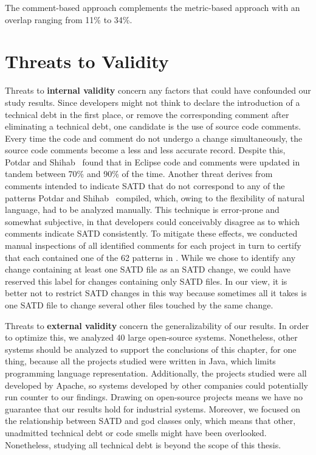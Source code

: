 {\begin{myboxii}
	The comment-based approach complements the metric-based approach with an overlap ranging from 11\% to 34\%.
\end{myboxii}



\pagebreak



\section{Threats to Validity}
\label{chap4:sec:threats_to_validity}


Threats to \textbf{internal validity} concern any factors that could have confounded our study results. Since developers might not think to declare the introduction of a technical debt in the first place, or remove the corresponding comment after eliminating a technical debt, one candidate is the use of source code comments. Every time the code and comment do not undergo a change simultaneously, the source code comments become a less and less accurate record. Despite this, Potdar and Shihab~\cite{ICSM_PotdarS14} found that in Eclipse code and comments were updated in tandem between 70\% and 90\% of the time. Another threat derives from comments intended to indicate SATD that do not correspond to any of the patterns Potdar and Shihab~\cite{ICSM_PotdarS14} compiled, which, owing to the flexibility of natural language, had to be analyzed manually. This technique is error-prone and somewhat subjective, in that developers could conceivably disagree as to which comments indicate SATD consistently. To mitigate these effects, we conducted manual inspections of all identified comments for each project in turn to certify that each contained one of the 62 patterns in \cite{ICSM_PotdarS14}. While we chose to identify any change containing at least one SATD file as an SATD change, we could have reserved this label for changes containing only SATD files. In our view, it is better not to restrict SATD changes in this way because sometimes all it takes is one SATD file to change several other files touched by the same change.


Threats to \textbf{external validity} concern the generalizability of our results. In order to optimize this, we analyzed 40 large open-source systems. Nonetheless, other systems should be analyzed to support the conclusions of this chapter, for one thing, because all the projects studied were written in Java, which limits programming language representation. Additionally, the projects studied were all developed by Apache, so systems developed by other companies could potentially run counter to our findings. Drawing on open-source projects means we have no guarantee that our results hold for industrial systems. Moreover, we focused on the relationship between SATD and god classes only, which means that other, unadmitted technical debt or code smells might have been overlooked. Nonetheless, studying all technical debt is beyond the scope of this thesis.

}
